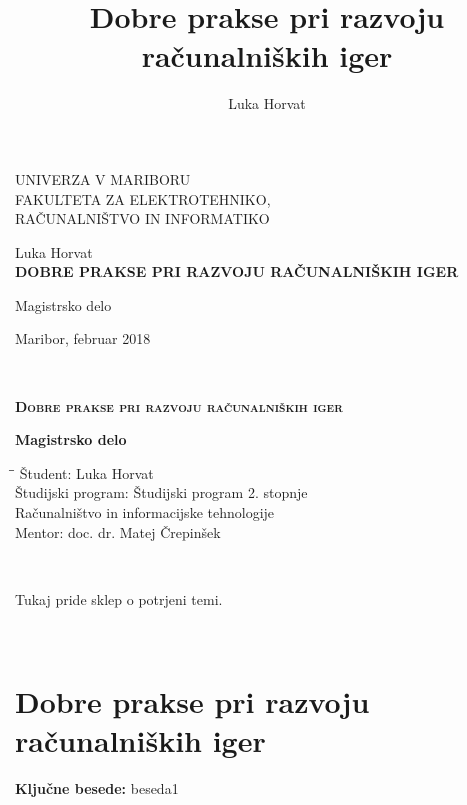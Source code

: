 \documentclass[12pt,a4paper,twoside]{book}
\author{Luka Horvat}
\title{Dobre prakse pri razvoju računalniških iger}
\begin{document}
	
\thispagestyle{empty} 
\begin{center}
	{\large 
		UNIVERZA V MARIBORU\\
		FAKULTETA ZA ELEKTROTEHNIKO,\\
		RAČUNALNIŠTVO IN INFORMATIKO\\
	}
	
	\vspace{\fill}
	{\LARGE Luka Horvat}\\
	
	\vspace{1cm}
	\textsc{\textbf{\LARGE DOBRE PRAKSE PRI RAZVOJU RAČUNALNIŠKIH IGER\\}}
	
	\vspace{1cm}
	{\LARGE Magistrsko delo}
	
	\vfill
	{\Large Maribor, februar 2018}
	\newpage
\end{center}

\ \thispagestyle{empty}
\newpage

\thispagestyle{empty} 
\begin{center}	
	\vspace*{\fill}
	\textsc{\textbf{\LARGE
			Dobre prakse pri razvoju računalniških iger\\
	}}
	{\large\textbf{Magistrsko delo\\}
		
	}
	\vspace{\fill}
	\begin{tabbing}
		\hspace*{4cm}\=\hspace*{3cm}\= \kill
		Študent: \> Luka Horvat\\
		Študijski program: \> Študijski program 2. stopnje\\
		\>Računalništvo in informacijske tehnologije\\
		Mentor: \> doc. dr. Matej Črepinšek
	\end{tabbing}
\end{center}
\newpage

\ \thispagestyle{empty}
\newpage

\thispagestyle{empty}
Tukaj pride sklep o potrjeni temi.
\newpage

\ \thispagestyle{empty}
\newpage

\chapter*{Dobre prakse pri razvoju računalniških iger}\thispagestyle{fancy}
\setcounter{page}{1}
\textbf{Ključne besede:} beseda1
\end{document}
